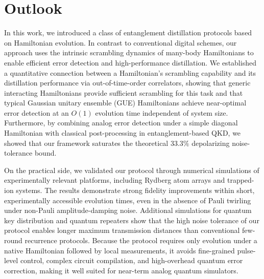 \documentclass[onecolumn,prx,longbibliography,nofootinbib, superscriptaddress]{revtex4-2}
\theoremstyle{recap}
\begin{document}
\section{Outlook}\label{sec:outlook} 

In this work, we introduced a class of entanglement distillation protocols based on Hamiltonian evolution. In contrast to conventional digital schemes, our approach uses the intrinsic scrambling dynamics of many-body Hamiltonians to enable efficient error detection and high-performance distillation. We established a quantitative connection between a Hamiltonian's scrambling capability and its distillation performance via out-of-time-order correlators, showing that generic interacting Hamiltonians provide sufficient scrambling for this task and that typical Gaussian unitary ensemble (GUE) Hamiltonians achieve near-optimal error detection at an $O(1)$ evolution time independent of system size. Furthermore, by combining analog error detection under a simple diagonal Hamiltonian with classical post-processing in entanglement-based QKD, we showed that our framework saturates the theoretical $33.3\%$ depolarizing noise-tolerance bound.

On the practical side, we validated our protocol through numerical simulations of experimentally relevant platforms, including Rydberg atom arrays and trapped-ion systems. The results demonstrate strong fidelity improvements within short, experimentally accessible evolution times, even in the absence of Pauli twirling under non-Pauli amplitude-damping noise. Additional simulations for quantum key distribution and quantum repeaters show that the high noise tolerance of our protocol enables longer maximum transmission distances than conventional few-round recurrence protocols. Because the protocol requires only evolution under a native Hamiltonian followed by local measurements, it avoids fine-grained pulse-level control, complex circuit compilation, and high-overhead quantum error correction, making it well suited for near-term analog quantum simulators.
\end{document}
